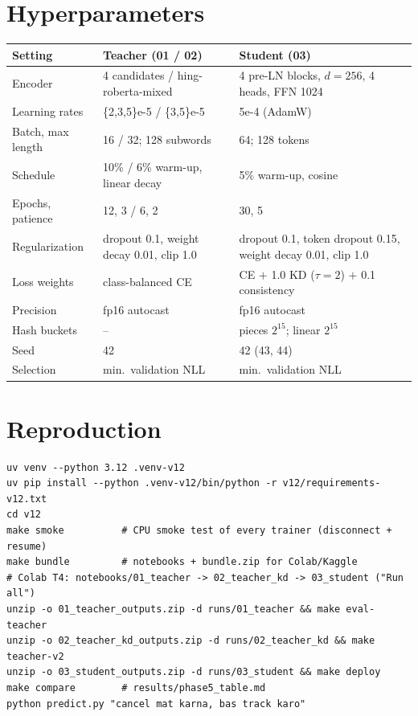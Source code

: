 \documentclass[11pt,a4paper]{article}
\theoremstyle{remark}
\begin{document}
\section{Hyperparameters}
\begin{table}[h]
\centering\small
\begin{tabular}{@{}l l l@{}}
\toprule
Setting & Teacher (01 / 02) & Student (03) \\
\midrule
Encoder & 4 candidates / hing-roberta-mixed & 4 pre-LN blocks, $d{=}256$, 4 heads, FFN 1024 \\
Learning rates & \{2,3,5\}e-5 / \{3,5\}e-5 & 5e-4 (AdamW) \\
Batch, max length & 16 / 32; 128 subwords & 64; 128 tokens \\
Schedule & 10\% / 6\% warm-up, linear decay & 5\% warm-up, cosine \\
Epochs, patience & 12, 3 / 6, 2 & 30, 5 \\
Regularization & dropout 0.1, weight decay 0.01, clip 1.0 & dropout 0.1, token dropout 0.15, weight decay 0.01, clip 1.0 \\
Loss weights & class-balanced CE & CE $+$ 1.0 KD ($\tau{=}2$) $+$ 0.1 consistency \\
Precision & fp16 autocast & fp16 autocast \\
Hash buckets & -- & pieces $2^{15}$; linear $2^{15}$ \\
Seed & 42 & 42 (43, 44) \\
Selection & min.\ validation NLL & min.\ validation NLL \\
\bottomrule
\end{tabular}
\end{table}

\section{Reproduction}
\begin{lstlisting}
uv venv --python 3.12 .venv-v12
uv pip install --python .venv-v12/bin/python -r v12/requirements-v12.txt
cd v12
make smoke          # CPU smoke test of every trainer (disconnect + resume)
make bundle         # notebooks + bundle.zip for Colab/Kaggle
# Colab T4: notebooks/01_teacher -> 02_teacher_kd -> 03_student ("Run all")
unzip -o 01_teacher_outputs.zip -d runs/01_teacher && make eval-teacher
unzip -o 02_teacher_kd_outputs.zip -d runs/02_teacher_kd && make teacher-v2
unzip -o 03_student_outputs.zip -d runs/03_student && make deploy
make compare        # results/phase5_table.md
python predict.py "cancel mat karna, bas track karo"
\end{lstlisting}
\end{document}
